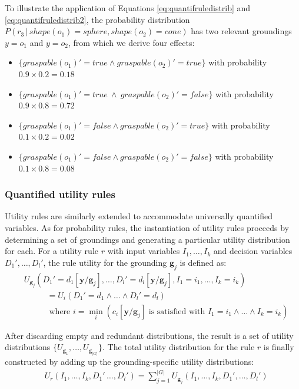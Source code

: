 To illustrate the application of Equations \eqref{eq:quantifruledistrib} and \eqref{eq:quantifruledistrib2}, the probability distribution $P(r_3 \, | \, \mathit{shape}(o_1)\!=\!\mathit{sphere}, \mathit{shape}(o_2)\!=\!\mathit{cone})$ has two relevant groundings $y\!=\!o_1$ and $y\!=\!o_2$, from which we derive four effects:
\begin{itemize}
\item $\{\mathit{graspable}(o_1)'\!=\!true \land \mathit{graspable}(o_2)'\!=\!true \} $ with probability $0.9\times0.2\!=\!0.18$
\item $\{\mathit{graspable}(o_1)'\!=\!true \ \land \  \mathit{graspable}(o_2)'\!=\!false\}$ with probability $0.9\times0.8\!=\!0.72$ 
\item $\{ \mathit{graspable}(o_1)'\!=\!false \land \mathit{graspable}(o_2)'\!=\!true \}$ with probability $0.1\times0.2\!=\!0.02$
\item $\{\mathit{graspable}(o_1)'\!=\!false \land \mathit{graspable}(o_2)'\!=\!false\}$ with probability $0.1\times0.8\!=\!0.08$
\end{itemize}


\subsubsection*{Quantified utility rules}

Utility rules are similarly extended to accommodate universally quantified variables. As for probability rules, the instantiation of utility rules proceeds by determining a set of groundings and generating a particular utility distribution for each. 
For a utility rule $r$ with input variables $I_1, \dots, I_k$ and decision variables $D_1', \dots, D_l'$, the rule utility for the grounding $\mathbf{g}_j$ is defined as:
 \begin{align}
& U_{\mathbf{g}_j}(D_1'\!=\!d_1[\mathbf{y} / \mathbf{g}_j], \dots, D_l'\!=\!d_l[\mathbf{y} / \mathbf{g}_j], I_1\!=\!i_1, \dots, I_k\!=\!i_k) \label{eq:quantifuruledistrib} \\ 
& \; \; \; \; \; \; \; \;   \; \; = U_i(D_1'\!=\!d_1 \land \dots \land D_l'\!=\!d_l) \nonumber \\
& \; \; \; \; \; \; \; \;   \; \; \;\text{where } i = \min_i (c_i[\mathbf{y} / \mathbf{g}_j]\text{ is satisfied with } I_1\!=\!i_1 \land \dots \land I_k\!=\!i_k) \nonumber
\end{align}

After discarding empty and redundant distributions, the result is a set of utility distributions $ \{ U_{\mathbf{g}_1}, \dots, U_{\mathbf{g}_{|G|}} \}$. The total utility distribution for the rule $r$ is finally constructed by adding up the grounding-specific utility distributions:   
\begin{align}
& U_{r}(I_1, \dots, I_k, D_1'\, \dots, D_l') = \sum_{j=1}^{|G|} U_{\mathbf{g}_j}(I_1, \dots, I_k, D_1', \dots, D_l') \label{eq:quantifuruledistrib2}
\end{align}


